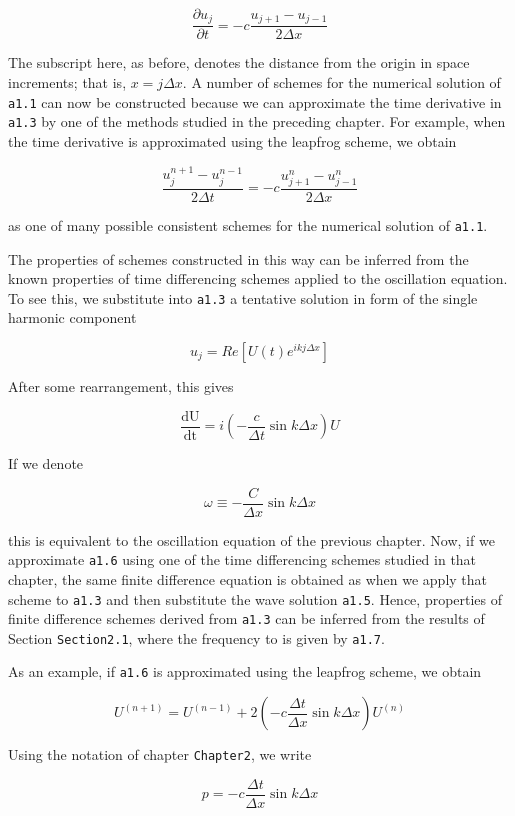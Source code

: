{\[\frac{\partial u_{j}}{\partial t} = - c\frac{u_{j + 1} - u_{j - 1}}{2\Delta x}\]}

The subscript here, as before, denotes the distance from the origin in
space increments; that is, \(x = j\Delta x\). A number of schemes for
the numerical solution of \texttt{a1.1} can now be constructed because
we can approximate the time derivative in \texttt{a1.3} by one of the
methods studied in the preceding chapter. For example, when the time
derivative is approximated using the leapfrog scheme, we obtain

{\[\frac{u_{j}^{n + 1} - u_{j}^{n - 1}}{2\Delta t} = - c\frac{u_{j + 1}^n - u_{j - 1}^n}{2\Delta x}\]}

as one of many possible consistent schemes for the numerical solution of
\texttt{a1.1}.

The properties of schemes constructed in this way can be inferred from
the known properties of time differencing schemes applied to the
oscillation equation. To see this, we substitute into \texttt{a1.3} a
tentative solution in form of the single harmonic component

{\[u_{j} = Re\left\lbrack U\left( t \right)e^{ikj\Delta x} \right\rbrack\]}

After some rearrangement, this gives

{\[\frac{\text{dU}}{\text{dt}} = i\left( - \frac{c}{\Delta t}\sin{k\Delta x} \right)U\]}

If we denote

{\[\omega \equiv - \frac{C}{\Delta x}\sin{k\Delta x}\]}

this is equivalent to the oscillation equation of the previous chapter.
Now, if we approximate \texttt{a1.6} using one of the time differencing
schemes studied in that chapter, the same finite difference equation is
obtained as when we apply that scheme to \texttt{a1.3} and then
substitute the wave solution \texttt{a1.5}. Hence, properties of finite
difference schemes derived from \texttt{a1.3} can be inferred from the
results of Section \texttt{Section2.1}, where the frequency to is given
by \texttt{a1.7}.

As an example, if \texttt{a1.6} is approximated using the leapfrog
scheme, we obtain

{\[U^{\left( n + 1 \right)} = U^{\left( n - 1 \right)} + 2\left( - c\frac{\Delta t}{\Delta x}\sin{k\Delta x} \right)U^{\left( n \right)}\]}

Using the notation of chapter \texttt{Chapter2}, we write

{\[p = - c\frac{\Delta t}{\Delta x}\sin{k\Delta x}\]}

